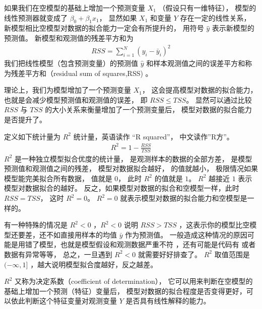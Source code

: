 \documentclass[letterpaper,10pt,english]{sphinxmanual}
\begin{document}
如果我们在空模型的基础上增加一个预测变量 \(X_1\) （假设只有一维特征），
模型的线性预测器就变成了 \(\beta_0 + \beta_1 x_1\)，
显然如果 \(X_1\) 和变量 \(Y\) 存在一定的线性关系，
新模型相比空模型对数据的拟合能力一定会有所提升的，
用符号 \(\hat{y}\) 表示新模型的预测值。
新模型和观测值的残差平方和为
\begin{equation}\label{equation:模型评估/content:模型评估/content:16}
\begin{split}RSS = \sum_{i=1}^N(y_i -\bar{y}_i)^2\end{split}
\end{equation}
我们把线性模型（包含预测变量）的预测值 \(\hat{y}\)
和样本观测值之间的误差平方和称为残差平方和（residual sum of squares,RSS)
。

理论上，我们为模型增加了一个预测变量 \(X_1\)，
这会提高模型对数据的拟合能力，也就是会减少模型预测值和观测值的误差，
即 \(RSS \leq TSS\)。
显然可以通过比较 \(RSS\) 与 \(TSS\) 的大小关系来衡量增加了一个预测变量后，
模型对数据的拟合能力是否提升了。

定义如下统计量为 \(R^2\) 统计量，英语读作 “R squared”，
中文读作”R方”。
\begin{equation}\label{equation:模型评估/content:模型评估/content:17}
\begin{split}R^2 = 1 - \frac{RSS}{TSS}\end{split}
\end{equation}
\(R^2\) 是一种独立模型拟合优度的统计量，
 是观测样本的数据的全部方差，
 是模型预测值和观测值之间的残差，
模型对数据拟合越好， 的值就越小，
极限情况如果模型能完美拟合所有数据， 值就是 \(0\)，
此时 \(R^2\) 的值就是 \(1\)。
\(R^2\) 越接近 \(1\) 表示模型对数据拟合的越好。
反之，如果模型对数据的拟合和空模型一样，此时 \(RSS=TSS\)，
这时 \(R^2=0\)。
\(R^2=0\) 就表示模型对数据的拟合能力和空模型是一样的。

有一种特殊的情况是 \(R^2 <0\)
，\(R^2 <0\) 说明 \(RSS > TSS\)
，这表示你的模型比空模型还要差，还不如直接用样本的均值 \(\bar{y}\)
作为预测值。
一般造成这种情况的原因可能是用错了模型，也就是模型假设和观测数据严重不符
，还有可能是代码有  或者数据有异常等等，
总之，一旦遇到 \(R^2 <0\) 就需要好好排查了。
\(R^2\) 取值范围是 \((-\infty,1]\)
，越大说明模型拟合度越好，反之越差。

\(R^2\) 又称为决定系数（coefficient of determination），
它可以用来判断在空模型的基础上增加一个预测（特征）变量后，
模型对数据的拟合程度是否变得更好，可以依此判断这个特征变量对观测变量 \(Y\)
是否具有线性解释的能力。
\end{document}
